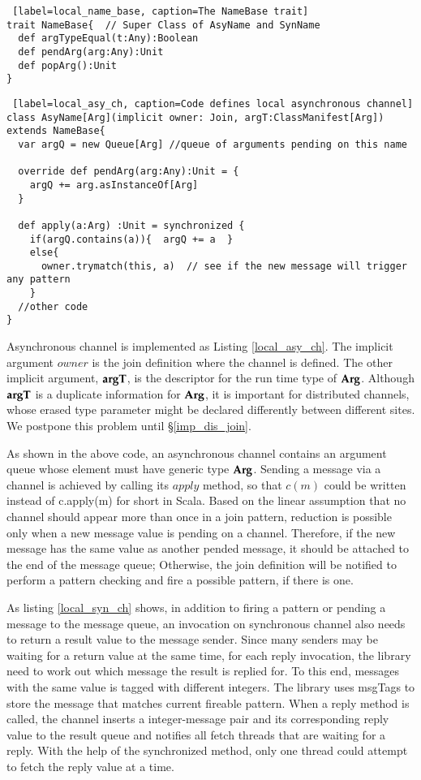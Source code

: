 \begin{lstlisting} [label=local_name_base, caption=The NameBase trait]
trait NameBase{  // Super Class of AsyName and SynName
  def argTypeEqual(t:Any):Boolean
  def pendArg(arg:Any):Unit
  def popArg():Unit
}
\end{lstlisting}

\begin{lstlisting} [label=local_asy_ch, caption=Code defines local asynchronous channel]
class AsyName[Arg](implicit owner: Join, argT:ClassManifest[Arg]) extends NameBase{
  var argQ = new Queue[Arg] //queue of arguments pending on this name

  override def pendArg(arg:Any):Unit = {
    argQ += arg.asInstanceOf[Arg]
  }

  def apply(a:Arg) :Unit = synchronized { 
    if(argQ.contains(a)){  argQ += a  }
    else{
      owner.trymatch(this, a)  // see if the new message will trigger any pattern
    }
  //other code
}
\end{lstlisting}

Asynchronous channel is implemented as Listing \ref{local_asy_ch}.  The implicit argument $owner$ is the join definition where the channel is defined.  The other implicit argument, $\bf{argT}$, is the descriptor for the run time type of $\bf{Arg}$.  Although $\bf{argT}$ is a duplicate information for $\bf{Arg}$, it is important for distributed channels, whose erased type parameter might be declared differently between different sites.  We postpone this problem until  \S\ref{imp_dis_join}.

As shown in the above code, an asynchronous channel contains an argument queue whose element must have generic type $\bf{Arg}$.  Sending a message via a channel is achieved by calling its $apply$ method, so that $c(m)$ could be written instead of c.apply(m) for short in Scala.   Based on the linear assumption that no channel should appear more than once in a join pattern, reduction is possible only when a new message value is pending on a channel.  Therefore, if the new message has the same value as another pended message, it should be attached to the end of the message queue;  Otherwise, the join definition will be notified to perform a pattern checking and fire a possible pattern, if there is one.

As listing \ref{local_syn_ch} shows, in addition to firing a pattern or pending a message to the message queue, an invocation on synchronous channel also needs to return a result value to the message sender.  Since many senders may be waiting for a return value at the same time, for each reply invocation, the library need to work out which message the result is replied for.  To this end, messages with the same value is tagged with different integers.  The library uses msgTags to store the message that matches current fireable pattern.  When a reply method is called, the channel inserts a integer-message pair and its corresponding reply value to the result queue and notifies all fetch threads that are waiting for a reply.  With the help of the synchronized method, only one thread could attempt to fetch the reply value at a time.

